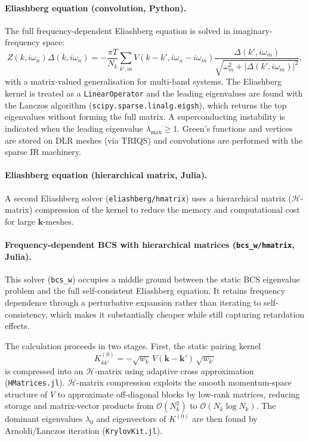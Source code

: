\paragraph{Eliashberg equation (convolution, Python).}
The full frequency-dependent Eliashberg equation is solved in imaginary-frequency
space:
\[
    Z(k,i\omega_n)\Delta(k,i\omega_n) =
    -\frac{\pi T}{N_k}\sum_{k',m} V(k-k',i\omega_n - i\omega_m)
    \frac{\Delta(k',i\omega_m)}{\sqrt{\omega_m^2 + |\Delta(k',i\omega_m)|^2}},
\]
with a matrix-valued generalisation for multi-band systems.  The Eliashberg kernel
is treated as a \texttt{LinearOperator} and the leading eigenvalues are found with
the Lanczos algorithm (\texttt{scipy.sparse.linalg.eigsh}), which returns the top
eigenvalues without forming the full matrix.  A superconducting instability is
indicated when the leading eigenvalue $\lambda_{\max} \geq 1$.  Green's functions
and vertices are stored on DLR meshes (via TRIQS) and convolutions are performed
with the sparse IR machinery.

\paragraph{Eliashberg equation (hierarchical matrix, Julia).}
A second Eliashberg solver (\texttt{eliashberg/hmatrix}) uses a hierarchical matrix
($\mathcal{H}$-matrix) compression of the kernel to reduce the memory and
computational cost for large $\mathbf{k}$-meshes.

\paragraph{Frequency-dependent BCS with hierarchical matrices (\texttt{bcs\_w/hmatrix}, Julia).}
This solver (\texttt{bcs\_w}) occupies a middle ground between the static BCS
eigenvalue problem and the full self-consistent Eliashberg equation.  It retains
frequency dependence through a perturbative expansion rather than iterating to
self-consistency, which makes it substantially cheaper while still capturing
retardation effects.

The calculation proceeds in two stages.  First, the static pairing kernel
\[
    K^{(0)}_{kk'} = -\sqrt{w_k}\,V(\mathbf{k}-\mathbf{k}')\,\sqrt{w_{k'}}
\]
is compressed into an $\mathcal{H}$-matrix using adaptive cross approximation
(\texttt{HMatrices.jl}).  $\mathcal{H}$-matrix compression exploits the smooth
momentum-space structure of $V$ to approximate off-diagonal blocks by low-rank
matrices, reducing storage and matrix-vector products from $\mathcal{O}(N_k^2)$ to
$\mathcal{O}(N_k \log N_k)$.  The dominant eigenvalues $\lambda_0$ and eigenvectors
of $K^{(0)}$ are then found by Arnoldi/Lanczos iteration (\texttt{KrylovKit.jl}).

